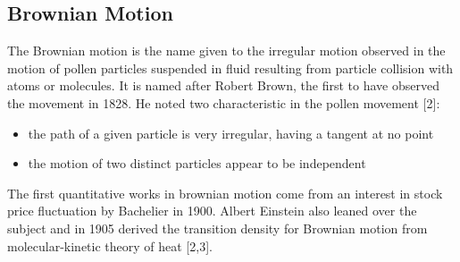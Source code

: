 \documentclass[12pt,twoside]{reedthesis}
\theoremstyle{definition}
\theoremstyle{definition}
\theoremstyle{remark}
\begin{document}
  \subsection{Brownian Motion}\label{brownian-motion}
  
  The Brownian motion is the name given to the irregular motion observed
  in the motion of pollen particles suspended in fluid resulting from
  particle collision with atoms or molecules. It is named after Robert
  Brown, the first to have observed the movement in 1828. He noted two
  characteristic in the pollen movement {[}2{]}:
  \begin{itemize}
  \item
    the path of a given particle is very irregular, having a tangent at no
    point
  \item
    the motion of two distinct particles appear to be independent
  \end{itemize}
  The first quantitative works in brownian motion come from an interest in
  stock price fluctuation by Bachelier in 1900. Albert Einstein also
  leaned over the subject and in 1905 derived the transition density for
  Brownian motion from molecular-kinetic theory of heat {[}2,3{]}.
  
\end{document}
